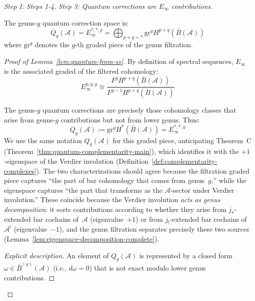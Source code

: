 \begin{proof}[Step I: Steps 1-4]
\emph{Step 3: Quantum corrections are $E_\infty$ contributions.}

\begin{lemma}
\label{lem:quantum-from-ss}
The genus-$g$ quantum correction space is:
\begin{equation}
Q_g(\mathcal{A}) = E_\infty^{*,*,g} = \bigoplus_{p+q=*} \text{gr}^g H^{p+q}(
\bar{B}(\mathcal{A}))
\end{equation}
where $\text{gr}^g$ denotes the $g$-th graded piece of the genus filtration.
\end{lemma}

\begin{proof}[Proof of Lemma~\ref{lem:quantum-from-ss}]
By definition of spectral sequences, $E_\infty$ is the associated graded of the 
filtered cohomology:
\begin{equation}
E_\infty^{p,q,g} \cong \frac{F^g H^{p+q}(\bar{B}(\mathcal{A}))}{F^{g-1} H^{p+q}(
\bar{B}(\mathcal{A}))}
\end{equation}

The genus-$g$ quantum corrections are precisely those cohomology classes that arise 
from genus-$g$ contributions but not from lower genus. Thus:
\begin{equation}
Q_g(\mathcal{A}) := \text{gr}^g H^*(\bar{B}(\mathcal{A})) = E_\infty^{*,*,g}
\end{equation}
We use the same notation $Q_g(\mathcal{A})$ for this graded piece,
anticipating Theorem~C (Theorem~\ref{thm:quantum-complementarity-main}),
which identifies it with the $+1$-eigenspace of the Verdier involution
(Definition~\ref{def:complementarity-complexes}).
The two characterizations should agree because the filtration graded
piece captures ``the part of bar cohomology that comes from genus~$g$,''
while the eigenspace captures ``the part that transforms as the
$\mathcal{A}$-sector under Verdier involution.''
These coincide because the Verdier involution \emph{acts as genus
decomposition}: it sorts contributions according to whether they arise
from $j_*$-extended bar cochains of~$\mathcal{A}$ (eigenvalue~$+1$) or
from $j_!$-extended bar cochains of~$\mathcal{A}^!$ (eigenvalue~$-1$),
and the genus filtration separates precisely these two sources
(Lemma~\ref{lem:eigenspace-decomposition-complete}).

\emph{Explicit description.} An element of $Q_g(\mathcal{A})$ is represented by a closed form $\omega \in \bar{B}^{(g)}(\mathcal{A})$ (i.e., $d\omega = 0$) that is not exact modulo lower genus contributions.


\end{proof}
\end{proof}
